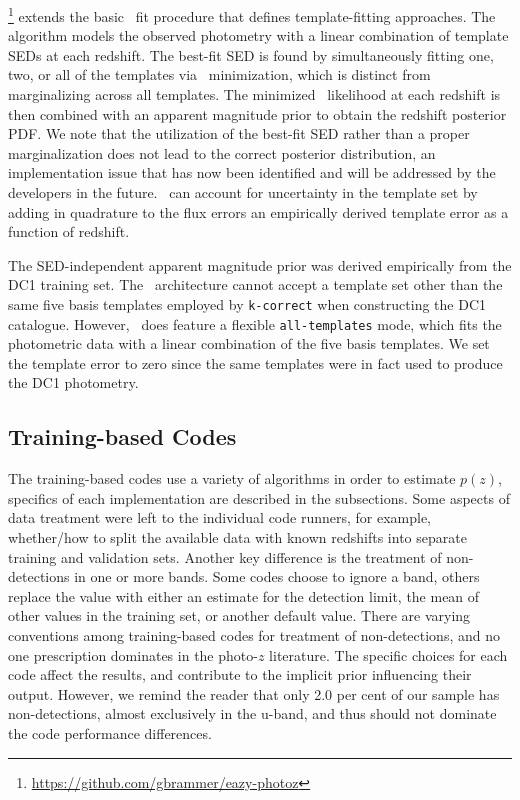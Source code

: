 \eazy \footnote{\url{https://github.com/gbrammer/eazy-photoz}} \citep[Easy and Accurate Photometric Redshifts from Yale,][]{Brammer:08} extends the basic \chisq\ fit procedure that defines template-fitting approaches.
The algorithm models the observed photometry with a linear combination of template SEDs at each redshift.
The best-fit SED is found by simultaneously fitting one, two, or all of the templates via \chisq\ minimization, which is distinct from marginalizing across all templates.
The minimized \chisq\ likelihood at each redshift is then combined with an apparent magnitude prior to obtain the redshift posterior PDF.
We note that the utilization of the best-fit SED rather than a proper marginalization does not lead to the correct posterior distribution, an implementation issue that has now been identified and will be addressed by the developers in the future.
\eazy\ can account for uncertainty in the template set by adding in quadrature to the flux errors an empirically derived template error as a function of redshift.

The SED-independent apparent magnitude prior was derived empirically from the DC1 training set.
The \eazy\ architecture cannot accept a template set other than the same five basis templates employed by \texttt{k-correct} when constructing the DC1 catalogue.
However, \eazy\ does feature a flexible \texttt{all-templates} mode, which fits the photometric data with a linear combination of the five basis templates.
We set the template error to zero since the same templates were in fact used to produce the DC1 photometry.

\subsection{Training-based Codes}
\label{sec:trainingcodes}

The training-based codes use a variety of algorithms in order to estimate $p(z)$, specifics of each implementation are described in the subsections.
Some aspects of data treatment were left to the individual code runners, for example, whether/how to split the available data with known redshifts into separate training and validation sets.
Another key difference is the treatment of non-detections in one or more bands.
Some codes choose to ignore a band, others replace the value with either an estimate for the detection limit, the mean of other values in the training set, or another default value.
There are varying conventions among training-based codes for treatment of non-detections, and no one prescription dominates in the photo-$z$ literature.
The specific choices for each code affect the results, and contribute to the implicit prior influencing their output.
However, we remind the reader that only 2.0 per cent of our sample has non-detections, almost exclusively in the u-band, and thus should not dominate the code performance differences.

